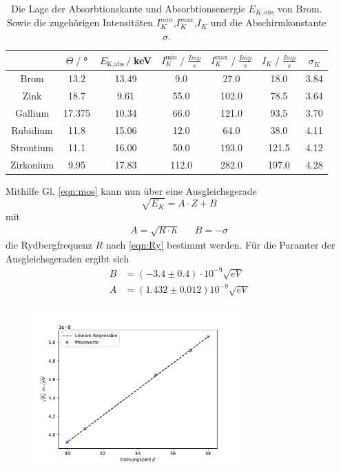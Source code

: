 \begin{table}
    \centering
    \begin{tabular}{c | c c c c c c}
        \toprule
        &$\Theta\;/\;$° & $E_{\text{K,abs}}\,/\;$keV & $I_K^{\text{min}}\;/\;\frac{Imp}{s}$ & $I_K^{\text{max}}\;/\;\frac{Imp}{s}$ & $I_K\;/\;\frac{Imp}{s}$ & $\sigma_K$\\
        \midrule
        Brom & 13.2 & 13.49 & 9.0 & 27.0 & 18.0 & 3.84\\
        Zink & 18.7 & 9.61 & 55.0 & 102.0 & 78.5 & 3.64\\
        Gallium & 17.375 & 10.34 & 66.0 & 121.0 & 93.5 & 3.70\\
        Rubidium & 11.8 & 15.06 & 12.0 & 64.0 & 38.0 & 4.11\\
        Strontium & 11.1 & 16.00 & 50.0 & 193.0 & 121.5 & 4.12\\
        Zirkonium & 9.95 & 17.83 & 112.0 & 282.0 & 197.0 & 4.28\\
        \bottomrule
    \end{tabular}
    \caption{Die Lage der Absorbtionskante und Absorbtionsenergie $E_{K,abs}$ von Brom.
        Sowie die zugehörigen Intensitäten $I_K^{min}$,$I_K^{max}$,$I_K$ und die Abschirmkonstante $\sigma$.}
\end{table}
\newpage
Mithilfe Gl. \ref{eqn:mos} kann nun über eine Ausgleichsgerade
\begin{equation}
        \sqrt{E_K}=A\cdot Z +B
\end{equation}
mit
\begin{align}
    A=\sqrt{R\cdot h}&&B=-\sigma
    \label{eqn:Ry}
\end{align}
die Rydbergfrequenz $R$ nach \ref{eqn:Ry} bestimmt werden.
Für die Paramter der Ausgleichsgeraden ergibt sich
\begin{align*}
    B&=(-3.4\pm 0.4)\cdot 10^{-9}\sqrt{\si{eV}}\\
    A&=(1.432\pm 0.012) 10^{-9}\sqrt{\si{eV}}\\
\end{align*}
\begin{figure}[H]
    \centering
    \includegraphics[width=0.7\textwidth]{plots/Moseley.pdf}
    \caption{}
\end{figure}
